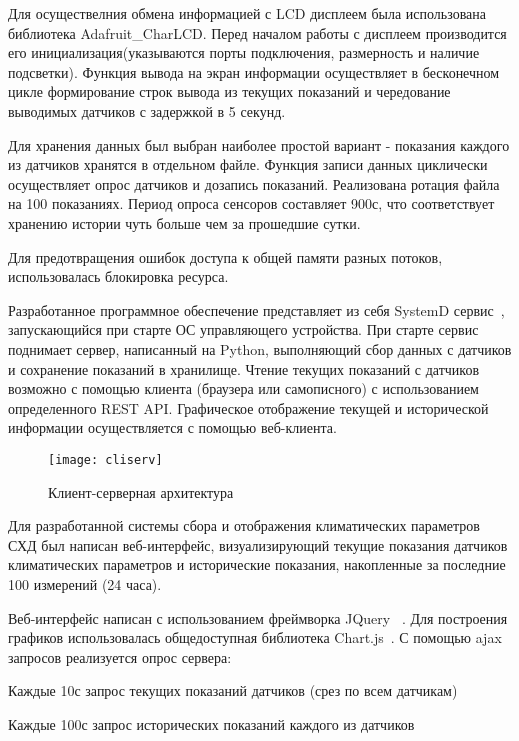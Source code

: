 Для осуществелния обмена информацией с LCD  дисплеем была использована библиотека Adafruit\_CharLCD. Перед началом работы с дисплеем производится его инициализация(указываются порты подключения, размерность и наличие подсветки). Функция вывода на экран информации осуществляет в бесконечном цикле формирование строк вывода из текущих показаний и чередование выводимых датчиков с задержкой в 5 секунд. 

Для хранения данных был выбран наиболее простой вариант - показания каждого из датчиков хранятся в отдельном файле. Функция записи данных циклически осуществляет опрос датчиков и дозапись показаний. Реализована ротация файла на 100 показаниях. Период опроса сенсоров составляет 900с, что соответствует хранению истории чуть больше чем за прошедшие сутки. 

Для предотвращения ошибок доступа к общей памяти разных потоков, использовалась блокировка ресурса.

Разработанное программное обеспечение представляет из себя SystemD сервис~\cite{SystemD}, запускающийся при старте ОС управляющего устройства. При старте сервис поднимает сервер, написанный на Python, выполняющий сбор данных с датчиков и сохранение показаний в хранилище. Чтение текущих показаний с датчиков возможно с помощью клиента (браузера или самописного) с использованием определенного REST API. Графическое отображение текущей и исторической информации осуществляется с помощью веб-клиента. 

\begin{figure}[h]
	\centering
	\texttt{[image: cliserv]}
	\caption{Клиент-серверная архитектура}
	\label{fig:cliserv}
\end{figure}

Для разработанной системы сбора и отображения климатических параметров СХД был написан веб-интерфейс, визуализирующий текущие показания датчиков климатических параметров и исторические показания, накопленные за последние 100 измерений (24 часа). 

Веб-интерфейс написан с использованием фреймворка JQuery ~\cite{jQuery}. Для построения графиков использовалась общедоступная библиотека Chart.js~\cite{Chartjs}. С помощью ajax запросов реализуется опрос сервера: 
\begin{itemize*}
	\item{Каждые 10с запрос текущих показаний датчиков (срез по всем датчикам)}
	\item{Каждые 100с запрос исторических показаний каждого из датчиков}
\end{itemize*}

